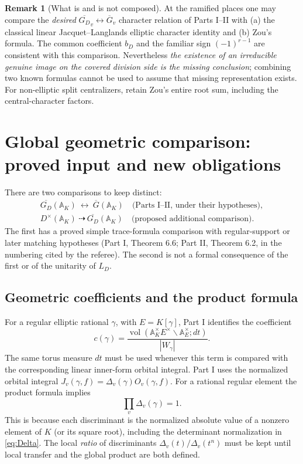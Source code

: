\documentclass[11pt]{article}
\newcommand{\A}{\mathbb A}
\newcommand{\vol}{\operatorname{vol}}
\newcommand{\Gb}{\overline G}
\newcommand{\GDb}{\overline{G_D}}
\theoremstyle{plain}
\theoremstyle{definition}
\newtheorem{remark}[theorem]{Remark}
\begin{document}
\begin{remark}[What is and is not composed]
At the ramified places one may compare the \emph{desired}
$\GDb_v\leftrightarrow\Gb_v$ character relation of Parts I--II
with (a) the classical linear Jacquet--Langlands elliptic
character identity and (b) Zou's formula.  The common coefficient
$b_D$ and the familiar sign $(-1)^{r-1}$ are consistent with
this comparison.  Nevertheless \emph{the existence of an
irreducible genuine image on the covered division side is the
missing conclusion}; combining two known formulas cannot be
used to assume that missing representation exists.
For non-elliptic split centralizers, retain Zou's entire
root sum, including the central-character factors.
\end{remark}

\section{Global geometric comparison: proved input and new obligations}\label{sec:geometric}
There are two comparisons to keep distinct:
\begin{equation}\label{eq:twocomparisons}
 \begin{gathered}
 \GDb(\A_K)\ \longleftrightarrow\ \Gb(\A_K)
 \quad\text{(Parts I--II, under their hypotheses)},\\[3pt]
 D^\times(\A_K)\ \dashrightarrow\ \GDb(\A_K)
 \quad\text{(proposed additional comparison)}.
 \end{gathered}
\end{equation}
The first has a proved simple trace-formula comparison with
regular-support or later matching hypotheses (Part I, Theorem 6.6;
Part II, Theorem 6.2, in the numbering cited by the referee).
The second is not a formal consequence of the first or of the
unitarity of $L_D$.

\subsection{Geometric coefficients and the product formula}
For a regular elliptic rational $\gamma$, with $E=K[\gamma]$,
Part I identifies the coefficient
\[
 c(\gamma)=\frac{\vol(\A_K^\times E^\times\backslash
 \A_E^\times;dt)}{|W_\gamma|}.
\]
The same torus measure $dt$ must be used whenever this term
is compared with the corresponding linear inner-form orbital integral.
Part I uses the normalized orbital integral
$J_v(\gamma,f)=\Delta_v(\gamma)O_v(\gamma,f)$.
For a rational regular element the product formula implies
\begin{equation}\label{eq:discprod}
 \prod_v\Delta_v(\gamma)=1.
\end{equation}
This is because each discriminant is the normalized absolute
value of a nonzero element of $K$ (or its square root), including
the determinant normalization in \eqref{eq:Delta}.
The local \emph{ratio} of discriminants
$\Delta_v(t)/\Delta_v(t^n)$ must be kept until local transfer
and the global product are both defined.
\end{document}
